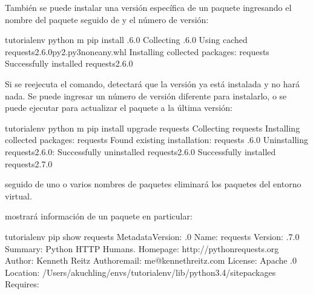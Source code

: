 \documentclass[a4,10pt,spanish]{sphinxmanual}
\begin{document}
\sphinxAtStartPar
También se puede instalar una versión específica de un paquete ingresando el nombre del paquete seguido de \sphinxcode{\sphinxupquote{==}} y el número de versión:

\begin{sphinxVerbatim}[commandchars=\\\{\}]
tutorial\PYGZhy{}env \PYGZdl{} python \PYGZhy{}m pip install .6.0
Collecting .6.0
  Using cached requests\PYGZhy{}2.6.0\PYGZhy{}py2.py3\PYGZhy{}none\PYGZhy{}any.whl
Installing collected packages: requests
Successfully installed requests\PYGZhy{}2.6.0
\end{sphinxVerbatim}

\sphinxAtStartPar
Si se re\sphinxhyphen{}ejecuta el comando,  detectará que la versión ya está instalada y no hará nada. Se puede ingresar un número de versión diferente para instalarlo, o se puede ejecutar  para actualizar el paquete a la última versión:

\begin{sphinxVerbatim}[commandchars=\\\{\}]
tutorial\PYGZhy{}env \PYGZdl{} python \PYGZhy{}m pip install \PYGZhy{}\PYGZhy{}upgrade requests
Collecting requests
Installing collected packages: requests
  Found existing installation: requests .6.0
    Uninstalling requests\PYGZhy{}2.6.0:
      Successfully uninstalled requests\PYGZhy{}2.6.0
Successfully installed requests\PYGZhy{}2.7.0
\end{sphinxVerbatim}

\sphinxAtStartPar
{} seguido de uno o varios nombres de paquetes eliminará los paquetes del entorno virtual.

\sphinxAtStartPar
{} mostrará información de un paquete en particular:

\begin{sphinxVerbatim}[commandchars=\\\{\}]
tutorial\PYGZhy{}env \PYGZdl{} pip show requests
\PYGZhy{}\PYGZhy{}\PYGZhy{}
Metadata\PYGZhy{}Version: .0
Name: requests
Version: .7.0
Summary: Python HTTP  Humans.
Home\PYGZhy{}page: http://python\PYGZhy{}requests.org
Author: Kenneth Reitz
Author\PYGZhy{}email: me@kennethreitz.com
License: Apache .0
Location: /Users/akuchling/envs/tutorial\PYGZhy{}env/lib/python3.4/site\PYGZhy{}packages
Requires:
\end{sphinxVerbatim}
\end{document}
